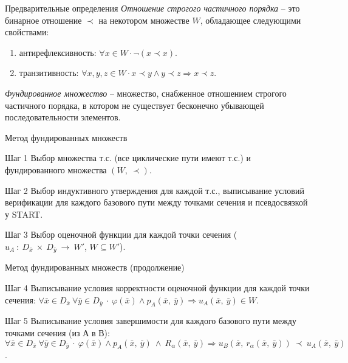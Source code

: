 \documentclass[hyperref={unicode=true}]{beamer}
\begin{document}
    \begin{frame}{Предварительные определения}
	\emph{Отношение строгого частичного порядка} -- это бинарное отношение $\prec$ на некотором множестве $W$, обладающее следующими свойствами:
    \begin{enumerate}
    \item антирефлексивность: $\forall x \in W \cdot \neg (x \prec x)$.
    \item транзитивность: $\forall x, y, z \in W \cdot x \prec y \land y \prec z \Rightarrow x \prec z$.
    \end{enumerate}

    \emph{Фундированное множество} -- множество, снабженное отношением строгого частичного порядка, в котором не существует бесконечно убывающей последовательности элементов.
    \end{frame}

	\begin{frame}{Метод фундированных множеств}

    \begin{block}{Шаг 1}
	Выбор множества т.с. (все циклические пути имеют т.с.) и фундированного множества $(W,~\prec)$.
	\end{block}
	\begin{block}{Шаг 2}
	Выбор индуктивного утверждения для каждой т.с., выписывание условий верификации для каждого
	базового пути между точками сечения и псевдосвязкой у START.
	\end{block}
	\begin{block}{Шаг 3}
	Выбор оценочной функции для каждой точки сечения ($u_A~:~D_{\bar{x}}~\times~D_{\bar{y}}~\rightarrow~W'$, $W \subseteq W'$).
	\end{block}
	\end{frame}

	\begin{frame}{Метод фундированных множеств (продолжение)}

	\begin{block}{Шаг 4}
	Выписывание условия корректности оценочной функции для каждой точки сечения:
	$\forall \bar{x} \in D_{\bar{x}} ~\forall \bar{y} \in D_{\bar{y}} ~\cdot~
	\varphi(\bar{x}) \land p_A(\bar{x},~\bar{y}) \Rightarrow u_A(\bar{x},~\bar{y}) \in W$.
	\end{block}
	\begin{block}{Шаг 5}
	Выписывание условия завершимости для каждого базового пути между точками сечения (из А в В):
	$\forall \bar{x} \in D_{\bar{x}} ~ \forall \bar{y} \in D_{\bar{y}} ~\cdot~
	\varphi(\bar{x}) \land p_A(\bar{x},~\bar{y})~\land~R_\alpha(\bar{x},~\bar{y}) \Rightarrow
	u_B(\bar{x},~r_\alpha(\bar{x},~\bar{y})) ~\prec~ u_A(\bar{x},~\bar{y})$.
	\end{block}
	\end{frame}
\end{document}

